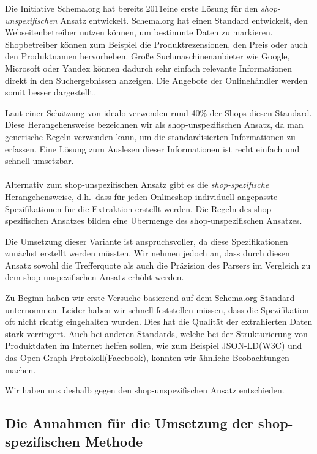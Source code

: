 Die Initiative Schema.org hat bereits 2011\footnotemark eine erste Lösung für den \textit{shop-unspezifischen} Ansatz
entwickelt.
Schema.org hat einen Standard entwickelt, den Webseitenbetreiber nutzen können, um bestimmte Daten zu markieren.
Shopbetreiber können zum Beispiel die Produktrezensionen, den Preis oder auch den Produktnamen hervorheben.
Große Suchmaschinenanbieter wie Google, Microsoft oder Yandex können dadurch sehr einfach relevante Informationen
direkt in den Suchergebnissen anzeigen.
Die Angebote der Onlinehändler werden somit besser dargestellt.

Laut einer Schätzung von idealo verwenden rund 40\% der Shops diesen Standard.
Diese Herangehensweise bezeichnen wir als shop-unspezifischen Ansatz, da man generische Regeln verwenden kann,
um die standardisierten Informationen zu erfassen.
Eine Lösung zum Auslesen dieser Informationen ist recht einfach und schnell umsetzbar.
\\
~\\
Alternativ zum shop-unspezifischen Ansatz gibt es die \textit{shop-spezifische} Herangehensweise, d.h.\ dass für jeden
Onlineshop individuell angepasste Spezifikationen für die Extraktion erstellt werden.
Die Regeln des shop-spezifischen Ansatzes bilden eine Übermenge des shop-unspezifischen Ansatzes.

Die Umsetzung dieser Variante ist anspruchsvoller, da diese Spezifikationen zunächst erstellt werden müssten.
Wir nehmen jedoch an, dass durch diesen Ansatz sowohl die Trefferquote als auch die Präzision des Parsers
im Vergleich zu dem shop-unspezifischen Ansatz erhöht werden.

Zu Beginn haben wir erste Versuche basierend auf dem Schema.org-Standard unternommen.
Leider haben wir schnell feststellen müssen, dass die Spezifikation oft nicht richtig eingehalten wurden.
Dies hat die Qualität der extrahierten Daten stark verringert.
Auch bei anderen Standards, welche bei der Strukturierung von Produktdaten im Internet helfen sollen, wie zum Beispiel
JSON-LD\footnotemark (W3C) und das Open-Graph-Protokoll\footnotemark (Facebook), konnten wir ähnliche Beobachtungen
machen.

Wir haben uns deshalb gegen den shop-unspezifischen Ansatz entschieden.

\subsection{Die Annahmen für die Umsetzung der shop-spezifischen Methode}
\label{subsec:annahmen}

